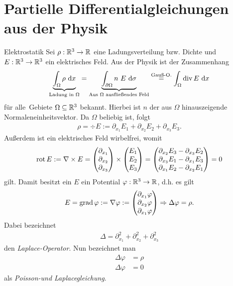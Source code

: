 \section{Partielle Differentialgleichungen aus der Physik}
\begin{genericdf}{Elektrostatik}
Sei $\rho  :  \mathbb{R}^3 \to \mathbb{R}$ eine Ladungsverteilung bzw. Dichte
und $E : \mathbb{R}^3 \to \mathbb{R}^3$ ein elektrisches Feld.
Aus der Physik ist der Zusammenhang
\begin{align*}
\underbrace{\int_\Omega \rho \ \text{\rmfamily d} x}_{\text{Ladung in $\Omega$}}
=
\underbrace{\int_{\partial\Omega} n \ E \ \text{\rmfamily d} \sigma}_{\text{Aus $\Omega$ ausfließendes Feld}}
\stackrel{\text{Gauß-O.}}{=}
\int_\Omega \operatorname{div} E \ \text{\rmfamily d} x
\end{align*}
für \glqq alle\grqq~Gebiete $\Omega \subseteq \mathbb{R}^3$ bekannt.
Hierbei ist $n$ der aus $\Omega$ hinauszeigende Normaleneinheitsvektor.
Da $\Omega$ beliebig ist, folgt
\begin{align*}
\rho = \div E 
:= \partial_{x_1} E_1 + \partial_{x_2} E_2 + \partial_{x_3} E_3.
\end{align*}
Außerdem ist ein elektrisches Feld wirbelfrei, womit
\begin{align*}
\operatorname{rot} E := \nabla \times E
=
\begin{pmatrix}
\partial_{x_1} \\
\partial_{x_2} \\
\partial_{x_3}
\end{pmatrix} 
\times
\begin{pmatrix}
E_1 \\ E_2 \\ E_3
\end{pmatrix}
= 
\begin{pmatrix}
\partial_{x_2} E_3 - \partial_{x_3} E_2\\
\partial_{x_3} E_1 - \partial_{x_1} E_3\\
\partial_{x_1} E_2 - \partial_{x_2} E_1
\end{pmatrix}
= 
0
\end{align*}
gilt. Damit besitzt ein $E$ ein Potential $\varphi : \mathbb{R}^3 \to \mathbb{R}$, d.h. es gilt
\begin{align*}
E = \operatorname{grad} \varphi := \nabla \varphi
:=
\begin{pmatrix}
\partial_{x_1} \varphi \\
\partial_{x_2} \varphi \\
\partial_{x_1} \varphi 
\end{pmatrix} 
\Rightarrow
\Delta \varphi = \rho.
\end{align*}
Dabei bezeichnet
\begin{align*}
\Delta = \partial_{x_1}^2 + \partial_{x_2}^2 + \partial_{x_3}^2
\end{align*}
den \textit{Laplace-Operator}.
Nun bezeichnet man
\begin{align*}
\Delta \varphi &= \rho\\
\Delta \varphi &= 0
\end{align*}
als \textit{Poisson-und Laplacegleichung}.
\end{genericdf}